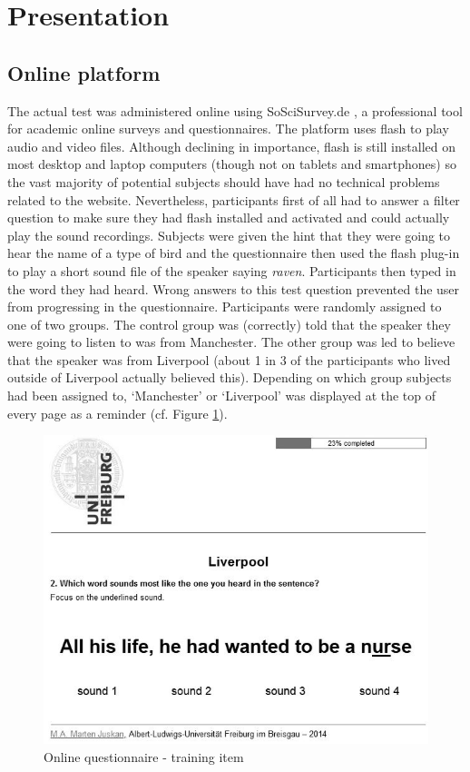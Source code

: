 \section{Presentation}
\label{sec.perc_method.pres}

\subsection{Online platform}
\label{sec.perc_method.pres.platform}

The actual test was administered online using SoSciSurvey.de \parencite{sosci}, a professional tool for academic online surveys and questionnaires.
The platform uses flash to play audio and video files.
Although declining in importance, flash is still installed on most desktop and laptop computers (though not on tablets and smartphones) so the vast majority of potential subjects should have had no technical problems related to the website.
Nevertheless, participants first of all had to answer a filter question to make sure they had flash installed and activated and could actually play the sound recordings.
Subjects were given the hint that they were going to hear the name of a type of bird and the questionnaire then used the flash plug-in to play a short sound file of the speaker saying \emph{raven}.
Participants then typed in the word they had heard.
Wrong answers to this test question prevented the user from progressing in the questionnaire.
Participants were randomly assigned to one of two groups.
The control group was (correctly) told that the speaker they were going to listen to was from Manchester.
The other group was led to believe that the speaker was from Liverpool (about 1 in 3 of the participants who lived outside of Liverpool actually believed this).
Depending on which group subjects had been assigned to, `Manchester' or `Liverpool' was displayed at the top of every page as a reminder (cf. Figure \ref{fig.online.screenshot}).

\begin{figure}[h]
	\includegraphics[width=\textwidth]{./figures/questionnaire_screenshot}
	\caption{Online questionnaire - training item}
	\label{fig.online.screenshot}
\end{figure}

